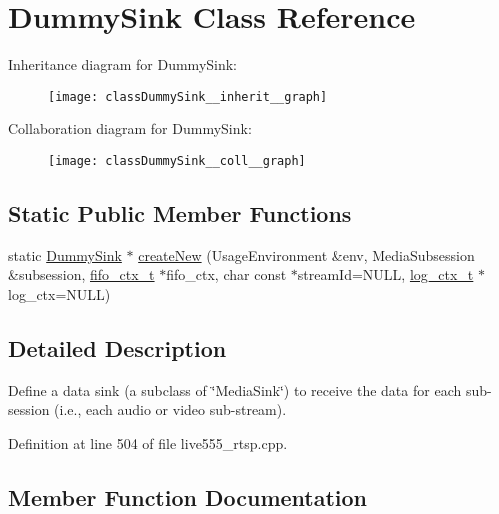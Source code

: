 \hypertarget{classDummySink}{}\section{Dummy\+Sink Class Reference}
\label{classDummySink}


Inheritance diagram for Dummy\+Sink\+:\nopagebreak
\begin{figure}[H]
\begin{center}
\leavevmode
\texttt{[image: classDummySink\_\_inherit\_\_graph]}
\end{center}
\end{figure}


Collaboration diagram for Dummy\+Sink\+:\nopagebreak
\begin{figure}[H]
\begin{center}
\leavevmode
\texttt{[image: classDummySink\_\_coll\_\_graph]}
\end{center}
\end{figure}
\subsection*{Static Public Member Functions}
\begin{DoxyCompactItemize}
\item 
static \hyperlink{classDummySink}{Dummy\+Sink} $\ast$ \hyperlink{classDummySink_af1d373302d3f27791ac565136321765b}{create\+New} (Usage\+Environment \&env, Media\+Subsession \&subsession, \hyperlink{structfifo__ctx__s}{fifo\+\_\+ctx\+\_\+t} $\ast$fifo\+\_\+ctx, char const $\ast$stream\+Id=N\+U\+LL, \hyperlink{structlog__ctx__s}{log\+\_\+ctx\+\_\+t} $\ast$log\+\_\+ctx=N\+U\+LL)
\end{DoxyCompactItemize}


\subsection{Detailed Description}
Define a data sink (a subclass of \char`\"{}\+Media\+Sink\char`\"{}) to receive the data for each sub-\/session (i.\+e., each audio or video \textquotesingle{}sub-\/stream\textquotesingle{}). 

Definition at line 504 of file live555\+\_\+rtsp.\+cpp.



\subsection{Member Function Documentation}
